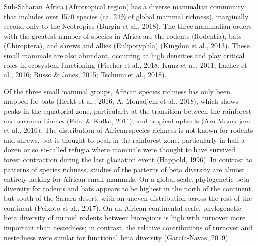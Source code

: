 \documentclass{article}
\begin{document}
\vspace{5mm}

Sub-Saharan Africa (Afrotropical region) has a diverse mammalian community that includes over 1570 species (ca. 24\% of global mammal richness), marginally second only to the Neotropics (Burgin et al., 2018). The three mammalian orders with the greatest number of species in Africa are the rodents (Rodentia), bats (Chiroptera), and shrews and allies (Eulipotyphla) (Kingdon et al., 2013). These small mammals are also abundant, occurring at high densities and play critical roles in ecosystem functioning (Fischer et al., 2018; Kunz et al., 2011; Lacher et al., 2016; Russo \& Jones, 2015; Tschumi et al., 2018). 

\vspace{5mm}
Of the three small mammal groups, African species richness has only been mapped for bats (Herkt et al., 2016; A. Monadjem et al., 2018), which shows peaks in the equatorial zone, particularly at the transition between the rainforest and savanna biomes (Fahr \& Kalko, 2011), and tropical uplands (Ara Monadjem et al., 2016). The distribution of African species richness is not known for rodents and shrews, but is thought to peak in the rainforest zone, particularly in half a dozen or so so-called refugia where mammals were thought to have survived forest contraction during the last glaciation event (Happold, 1996). In contrast to patterns of species richness, studies of the patterns of beta diversity are almost entirely lacking for African small mammals. On a global scale, phylogenetic beta diversity %
for rodents and bats appears to be highest in the north of the continent, but south of the Sahara desert, with an uneven distribution across the rest of the continent (Peixoto et al., 2017). On an African continental scale, phylogenetic beta diversity of muroid rodents between bioregions is high with turnover more important than nestedness; in contrast, the relative contributions of turnover and nestedness were similar for functional beta diversity (García-Navas, 2019). 
\end{document}
